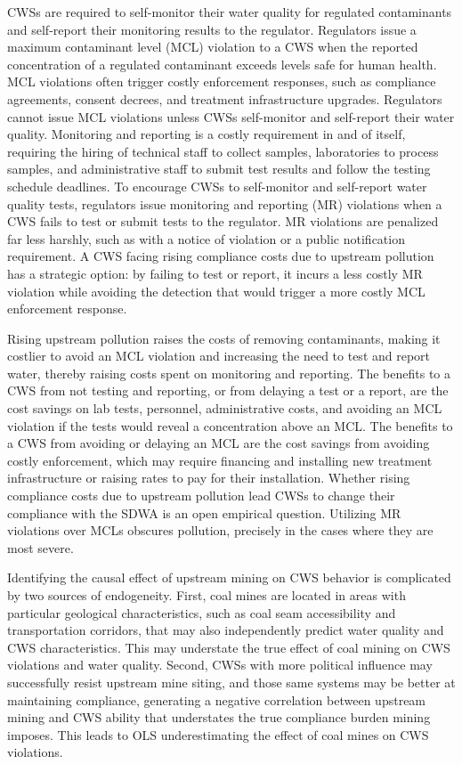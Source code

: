 \documentclass{article}
\begin{document}
CWSs are required to self-monitor their water quality for regulated contaminants and self-report their monitoring results to the regulator. Regulators issue a maximum contaminant level (MCL) violation to a CWS when the reported concentration of a regulated contaminant exceeds levels safe for human health. MCL violations often trigger costly enforcement responses, such as compliance agreements, consent decrees, and treatment infrastructure upgrades. Regulators cannot issue MCL violations unless CWSs self-monitor and self-report their water quality. Monitoring and reporting is a costly requirement in and of itself, requiring the hiring of technical staff to collect samples, laboratories to process samples, and administrative staff to submit test results and follow the testing schedule deadlines. To encourage CWSs to self-monitor and self-report water quality tests, regulators issue monitoring and reporting (MR) violations when a CWS fails to test or submit tests to the regulator. MR violations are penalized far less harshly, such as with a notice of violation or a public notification requirement. A CWS facing rising compliance costs due to upstream pollution has a strategic option: by failing to test or report, it incurs a less costly MR violation while avoiding the detection that would trigger a more costly MCL enforcement response. 

Rising upstream pollution raises the costs of removing contaminants, making it costlier to avoid an MCL violation and increasing the need to test and report water, thereby raising costs spent on monitoring and reporting. The benefits to a CWS from not testing and reporting, or from delaying a test or a report, are the cost savings on lab tests, personnel, administrative costs, and avoiding an MCL violation if the tests would reveal a concentration above an MCL. The benefits to a CWS from avoiding or delaying an MCL are the cost savings from avoiding costly enforcement, which may require financing and installing new treatment infrastructure or raising rates to pay for their installation. Whether rising compliance costs due to upstream pollution lead CWSs to change their compliance with the SDWA is an open empirical question. Utilizing MR violations over MCLs obscures pollution, precisely in the cases where they are most severe.

Identifying the causal effect of upstream mining on CWS behavior is complicated by two sources of endogeneity. First, coal mines are located in areas with particular geological characteristics, such as coal seam accessibility and transportation corridors, that may also independently predict water quality and CWS characteristics. This may understate the true effect of coal mining on CWS violations and water quality. Second, CWSs with more political influence may successfully resist upstream mine siting, and those same systems may be better at maintaining compliance, generating a negative correlation between upstream mining and CWS ability that understates the true compliance burden mining imposes. This leads to OLS underestimating the effect of coal mines on CWS violations.
\end{document}

